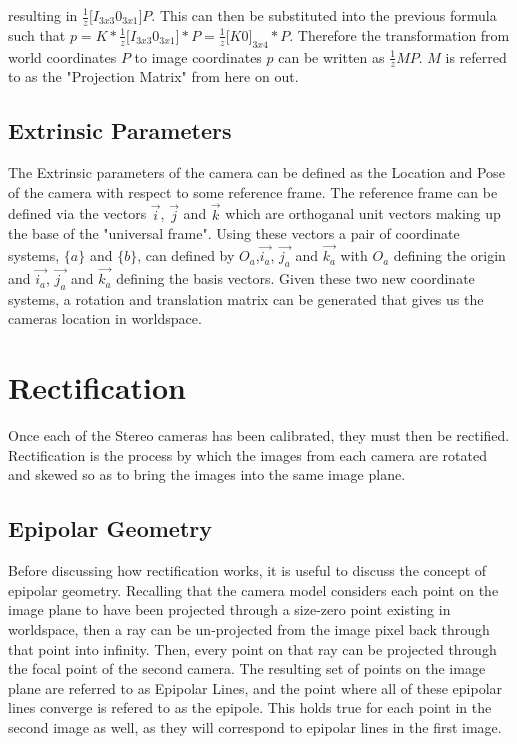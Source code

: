 resulting in $\frac{1}{z}\bigg[ I_{3x3} 0_{3x1} \bigg]P$.  This can then be substituted into the previous formula such that $p 
= K * \frac{1}{z}\bigg[I_{3x3}0_{3x1}\bigg] * P = \frac{1}{z}\bigg[K0\bigg]_{3x4}*P$.  Therefore the transformation from world 
coordinates $P$ to image coordinates $p$ can be written as $\frac{1}{z}MP$.  $M$ is referred to as the "Projection Matrix" from here 
on out.

\subsection{Extrinsic Parameters}
The Extrinsic parameters of the camera can be defined as the Location and Pose of the camera with respect to some reference frame.  The reference frame can be defined via the vectors $\vec{i}$, $\vec{j}$ and $\vec{k}$ which are orthoganal unit vectors making up the base of the "universal frame".  Using these vectors a pair of coordinate systems, $\{a\}$ and $\{b\}$, can defined by $O_a$,$\vec{i_a}$, $\vec{j_a}$ and $\vec{k_a}$ with $O_a$ defining the origin and $\vec{i_a}$, $\vec{j_a}$ and $\vec{k_a}$ defining the basis vectors.  Given these two new coordinate systems, a rotation and translation matrix can be generated that gives us the cameras location in worldspace.

\section{Rectification}
Once each of the Stereo cameras has been calibrated, they must then be rectified.  Rectification is the process by which the images from each camera are rotated and skewed so as to bring the images into the same image plane.

\subsection{Epipolar Geometry}
Before discussing how rectification works, it is useful to discuss the concept of epipolar geometry.  Recalling that the camera model considers each point on the image plane to have been projected through a size-zero point existing in worldspace, then a ray can be un-projected from the image pixel back through that point into infinity.  Then, every point on that ray can be projected through the focal point of the second camera. The resulting set of points on the image plane are referred to as Epipolar Lines, and the point where all of these epipolar lines converge is refered to as the epipole.  This holds true for each point in the second image as well, as they will correspond to epipolar lines in the first image.

